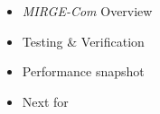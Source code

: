   \begin{itemize}
  \item \textit{MIRGE-Com} Overview
  \item Testing \& Verification
  \item Performance snapshot
  \item Next for \mirgecom
\end{itemize}

